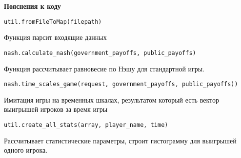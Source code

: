 
\textbf{Пояснения к коду}
\begin{lstlisting}[style=csharpinlinestyle]
util.fromFileToMap(filepath) 
\end{lstlisting}
Функция парсит входящие данных

\begin{lstlisting}[style=csharpinlinestyle]
nash.calculate_nash(government_payoffs, public_payoffs)
\end{lstlisting}
Функция рассчитывает равновесие по Нэшу для стандартной игры.


\begin{lstlisting}[style=csharpinlinestyle]
nash.time_scales_game(request, government_payoffs, public_payoffs))
\end{lstlisting}
Имитация игры на временных шкалах, результатом который есть вектор выигрышей игроков за время игры

\begin{lstlisting}[style=csharpinlinestyle]
util.create_all_stats(array, player_name, time)
\end{lstlisting}
Рассчитывает статистические параметры, строит гистограмму для выигрышей одного игрока.


